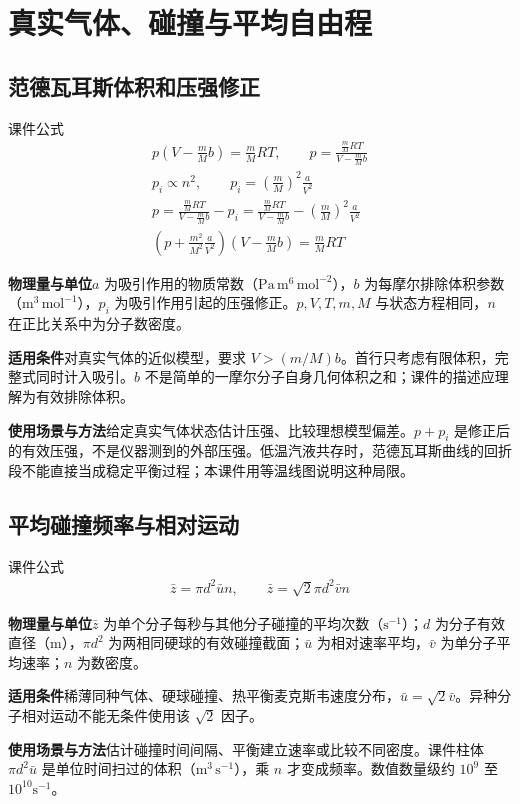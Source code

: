 \documentclass[UTF8,fontset=none,zihao=-4,a4paper]{ctexart}
\newcommand{\chapterpage}[1]{\clearpage\section{#1}}
\newcommand{\explain}[3]{\par\noindent\textbf{物理量与单位}\quad #1\par
\noindent\textbf{适用条件}\quad #2\par
\noindent\textbf{使用场景与方法}\quad #3\par}
\begin{document}
\chapterpage{真实气体、碰撞与平均自由程}
\par\noindent\begin{minipage}{\linewidth}
\subsection{范德瓦耳斯体积和压强修正}
\begin{infobox}[breakable=false]{课件公式}
\begin{gather*}p\left(V-\frac mM b\right)=\frac mM RT,\qquad p=\frac{\frac mM RT}{V-\frac mM b}\\p_i\propto n^2,\qquad p_i=\left(\frac mM\right)^2\frac a{V^2}\\p=\frac{\frac mM RT}{V-\frac mM b}-p_i=\frac{\frac mM RT}{V-\frac mM b}-\left(\frac mM\right)^2\frac a{V^2}\\\left(p+\frac{m^2}{M^2}\frac a{V^2}\right)\left(V-\frac mM b\right)=\frac mM RT\end{gather*}
\end{infobox}
\end{minipage}\par
\explain{$a$ 为吸引作用的物质常数（$\mathrm{Pa\,m^6\,mol^{-2}}$），$b$ 为每摩尔排除体积参数（$\mathrm{m^3\,mol^{-1}}$），$p_i$ 为吸引作用引起的压强修正。$p,V,T,m,M$ 与状态方程相同，$n$ 在正比关系中为分子数密度。}{对真实气体的近似模型，要求 $V>(m/M)b$。首行只考虑有限体积，完整式同时计入吸引。$b$ 不是简单的一摩尔分子自身几何体积之和；课件的描述应理解为有效排除体积。}{给定真实气体状态估计压强、比较理想模型偏差。$p+p_i$ 是修正后的有效压强，不是仪器测到的外部压强。低温汽液共存时，范德瓦耳斯曲线的回折段不能直接当成稳定平衡过程；本课件用等温线图说明这种局限。}


\par\noindent\begin{minipage}{\linewidth}
\subsection{平均碰撞频率与相对运动}
\begin{infobox}[breakable=false]{课件公式}
\begin{gather*}\bar z=\pi d^2\bar u n,\qquad\bar z=\sqrt2\pi d^2\bar v n\end{gather*}
\end{infobox}
\end{minipage}\par
\explain{$\bar z$ 为单个分子每秒与其他分子碰撞的平均次数（$\mathrm{s^{-1}}$）；$d$ 为分子有效直径（m），$\pi d^2$ 为两相同硬球的有效碰撞截面；$\bar u$ 为相对速率平均，$\bar v$ 为单分子平均速率；$n$ 为数密度。}{稀薄同种气体、硬球碰撞、热平衡麦克斯韦速度分布，$\bar u=\sqrt2\bar v$。异种分子相对运动不能无条件使用该 $\sqrt2$ 因子。}{估计碰撞时间间隔、平衡建立速率或比较不同密度。课件柱体 $\pi d^2\bar u$ 是单位时间扫过的体积（$\mathrm{m^3\,s^{-1}}$），乘 $n$ 才变成频率。数值数量级约 $10^9$ 至 $10^{10}\mathrm{s^{-1}}$。}
\end{document}
